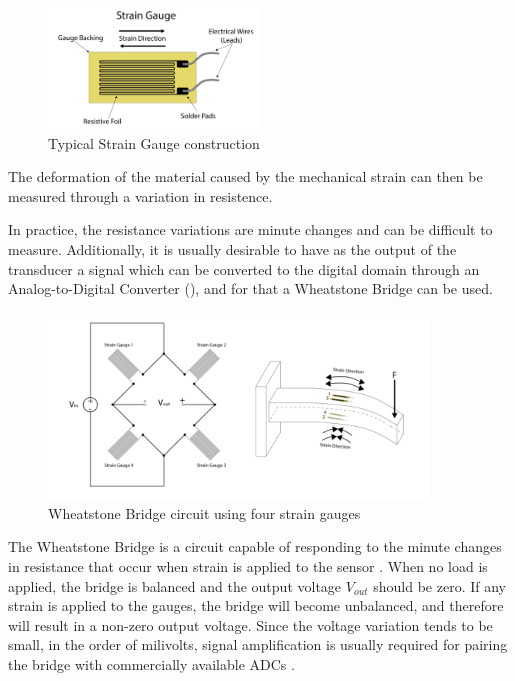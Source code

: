 \documentclass[openright]{normas-utf-tex} %
\begin{document}
\begin{figure}[H]
	\centering
	\includegraphics[width=0.5\textwidth]{./images/straingauge.png}
	\caption[Typical Strain Gauge construction]{Typical Strain Gauge construction}
	\label{fig:gauge1}
\end{figure}

The deformation of the material caused by the mechanical strain can then
be measured through a variation in resistence.

In practice, the resistance variations are minute changes and can be
difficult to measure. Additionally, it is usually desirable to have as the
output of the transducer a signal which can be converted to the digital domain
through an Analog-to-Digital Converter (), and for that a Wheatstone Bridge can be used.

\begin{figure}[H]
	\centering
	\includegraphics[width=0.9\textwidth]{./images/straingauge2.png}
	\caption[Wheatstone Bridge circuit using four strain gauges]{Wheatstone Bridge circuit using four strain gauges}
	\label{fig:gauge2}
\end{figure}

The Wheatstone Bridge is a circuit capable of responding to the minute changes
in resistance that occur when strain is applied to the sensor \cite{Michigan2020}.
When no load is applied, the bridge is balanced and the output voltage
$V_{out}$ should be zero. If any strain is applied to the gauges, the bridge
will become unbalanced, and therefore will result in a non-zero output voltage.
Since the voltage variation tends to be small, in the order of milivolts, signal amplification is usually
required for pairing the bridge with commercially available ADCs \cite{HorowitzHill2015}.
\end{document}

